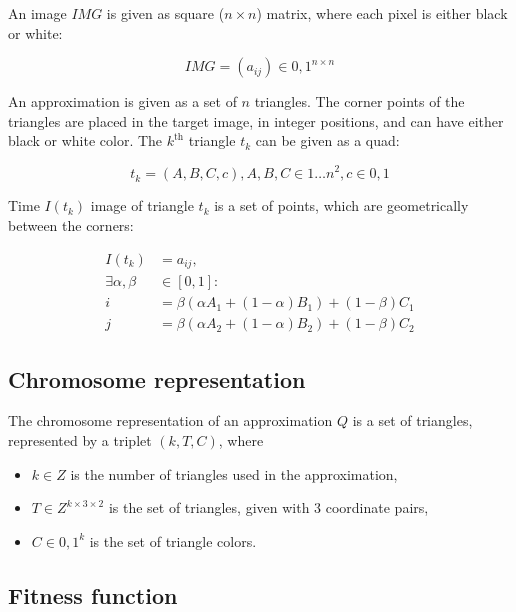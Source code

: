 \documentclass[conference]{IEEEtran}
\begin{document}
An image $IMG$ is given as square ($n \times n$) matrix, where each pixel is
either black or white:

\begin{equation}
	IMG = (a_{ij}) \in {0,1}^{n \times n}
\end{equation}

An approximation is given as a set of $n$ triangles. The corner points of
the triangles are placed in the target image, in integer positions,
and can have either black or white color. The $k^\text{th}$ triangle
$t_k$ can be given as a quad:

\begin{equation}
	t_k = (A, B, C, c), A, B, C \in {1 \dots n}^2, c \in {0, 1}
\end{equation}

Time $I(t_k)$ image of triangle $t_k$ is a set of points, which are geometrically
between the corners:

\begin{equation}
	\begin{split}
	I(t_k) &= {a_{ij}},\\
	\exists \alpha, \beta &\in [0, 1]:\\
	i &= \beta(\alpha A_1 + (1-\alpha)B_1)+(1-\beta)C_1\\
	j &= \beta(\alpha A_2 + (1-\alpha)B_2)+(1-\beta)C_2
	\end{split}
\end{equation}

\subsection{Chromosome representation}

The chromosome representation of an approximation $Q$ is
a set of triangles, represented by a triplet $(k, T, C)$, where

\begin{itemize}

	\item{$k \in Z$ is the number of triangles used in the approximation,}

	\item{$T \in Z^{k \times 3 \times 2}$ is the set of triangles,
	given with 3 coordinate pairs,}

	\item{$C \in {0,1}^k$ is the set of triangle colors.}

\end{itemize}

\subsection{Fitness function}
\end{document}
